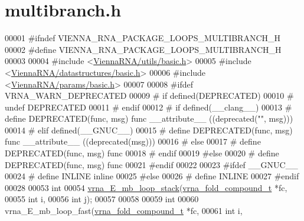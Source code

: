 \hypertarget{multibranch_8h_source}{}\section{multibranch.\+h}
\label{multibranch_8h_source}

\begin{DoxyCode}
00001 \textcolor{preprocessor}{#ifndef VIENNA\_RNA\_PACKAGE\_LOOPS\_MULTIBRANCH\_H}
00002 \textcolor{preprocessor}{#define VIENNA\_RNA\_PACKAGE\_LOOPS\_MULTIBRANCH\_H}
00003 
00004 \textcolor{preprocessor}{#include <\hyperlink{utils_2basic_8h}{ViennaRNA/utils/basic.h}>}
00005 \textcolor{preprocessor}{#include <\hyperlink{datastructures_2basic_8h}{ViennaRNA/datastructures/basic.h}>}
00006 \textcolor{preprocessor}{#include <\hyperlink{params_2basic_8h}{ViennaRNA/params/basic.h}>}
00007 
00008 \textcolor{preprocessor}{#ifdef VRNA\_WARN\_DEPRECATED}
00009 \textcolor{preprocessor}{# if defined(DEPRECATED)}
00010 \textcolor{preprocessor}{#   undef DEPRECATED}
00011 \textcolor{preprocessor}{# endif}
00012 \textcolor{preprocessor}{# if defined(\_\_clang\_\_)}
00013 \textcolor{preprocessor}{#  define DEPRECATED(func, msg) func \_\_attribute\_\_ ((deprecated("", msg)))}
00014 \textcolor{preprocessor}{# elif defined(\_\_GNUC\_\_)}
00015 \textcolor{preprocessor}{#  define DEPRECATED(func, msg) func \_\_attribute\_\_ ((deprecated(msg)))}
00016 \textcolor{preprocessor}{# else}
00017 \textcolor{preprocessor}{#  define DEPRECATED(func, msg) func}
00018 \textcolor{preprocessor}{# endif}
00019 \textcolor{preprocessor}{#else}
00020 \textcolor{preprocessor}{# define DEPRECATED(func, msg) func}
00021 \textcolor{preprocessor}{#endif}
00022 
00023 \textcolor{preprocessor}{#ifdef \_\_GNUC\_\_}
00024 \textcolor{preprocessor}{# define INLINE inline}
00025 \textcolor{preprocessor}{#else}
00026 \textcolor{preprocessor}{# define INLINE}
00027 \textcolor{preprocessor}{#endif}
00028 
00053 \textcolor{keywordtype}{int}
00054 \hyperlink{group__eval__loops__mb_ga91af6d5fcb0aef243a4071cf9e718020}{vrna\_E\_mb\_loop\_stack}(\hyperlink{group__fold__compound_structvrna__fc__s}{vrna\_fold\_compound\_t} *fc,
00055                      \textcolor{keywordtype}{int}                  i,
00056                      \textcolor{keywordtype}{int}                  j);
00057 
00058 
00059 \textcolor{keywordtype}{int}
00060 vrna\_E\_mb\_loop\_fast(\hyperlink{group__fold__compound_structvrna__fc__s}{vrna\_fold\_compound\_t}  *fc,
00061                     \textcolor{keywordtype}{int}                   i,

\end{DoxyCode}

